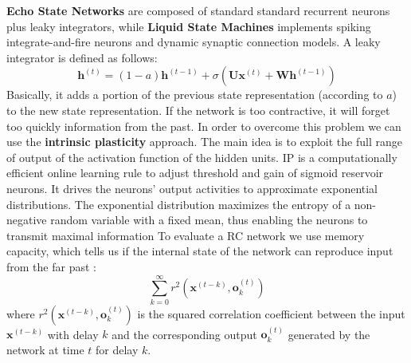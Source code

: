 \textbf{Echo State Networks} are composed of standard standard recurrent neurons plus leaky integrators, while \textbf{Liquid State Machines} implements spiking integrate-and-fire neurons and dynamic synaptic connection models. A leaky integrator is defined as follows:
\[\textbf{h}^{(t)} = (1 - a)\textbf{h}^{(t-1)} + \sigma(\textbf{U} \textbf{x}^{(t)} + \textbf{W}\textbf{h}^{(t-1)})\]
Basically, it adds a portion of the previous state representation (according to $a$) to the new state representation.\newline\newline 
If the network is too contractive, it will forget too quickly information from the past. In order to overcome this problem we can use the \textbf{intrinsic plasticity} approach. The main idea is to exploit the full range of output of the activation function of the hidden units. IP is a computationally efficient online learning rule to adjust threshold and gain of sigmoid reservoir neurons. It drives the neurons’ output activities to approximate exponential distributions. The exponential distribution maximizes the entropy of a non-negative random variable with a fixed mean, thus enabling the neurons to transmit maximal information\newline\newline
To evaluate  a RC network we use memory capacity, which tells us if the internal state of the network can reproduce input from the far past :
\[\sum_{k=0}^\infty r^2 (\textbf{x}^{(t - k)}, \textbf{o}_k^{(t)})\]
where $r^2 (\textbf{x}^{(t - k)}, \textbf{o}_k^{(t)})$ is the squared correlation coefficient between the input $\textbf{x}^{(t - k)}$ with delay $k$ and the corresponding output $\textbf{o}_k^{(t)}$ generated by the network at time $t$ for delay $k$.

